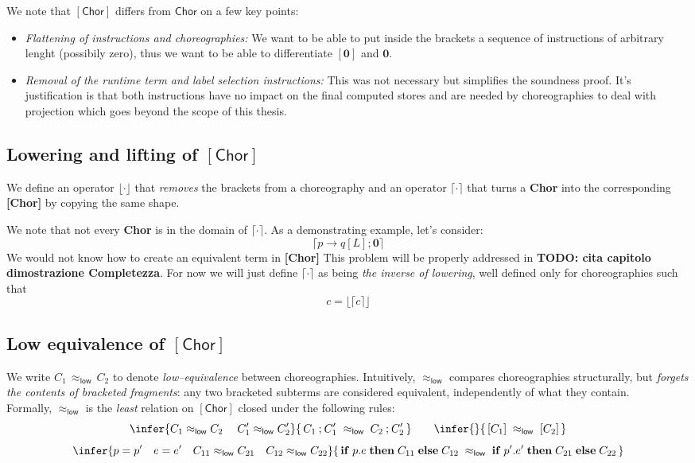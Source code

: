 \documentclass[12pt,a4paper,twoside]{book}
\begin{document}
We note that $\mathsf{[Chor]}$ differs from $\mathsf{Chor}$ on a few key points:
\begin{itemize}
	\item \emph{Flattening of instructions and choreographies:} We want to be able to put inside the brackets a sequence of instructions of arbitrary lenght (possibily zero), thus we want to be able to differentiate $[\boldsymbol{0}]$ and $\boldsymbol{0}$.
	\item \emph{Removal of the runtime term and label selection instructions:} This was not necessary but simplifies the soundness proof. It's justification is that both instructions have no impact on the final computed stores and are needed by choreographies to deal with projection\cite{montesi2023introduction} which goes beyond the scope of this thesis.
\end{itemize}

\subsection{Lowering and lifting of $\mathsf{[Chor]}$}
We define an operator $\lfloor \cdot \rfloor$ that \emph{removes} the brackets from a choreography and an operator $\lceil \cdot \rceil$ that turns a \textbf{Chor} into the corresponding \textbf{[Chor]} by copying the same shape.

We note that not every \textbf{Chor} is in the domain of $\lceil \cdot \rceil$.
As a demonstrating example, let's consider:
$$
\lceil p \rightarrow q[L]; \boldsymbol{0} \rceil
$$
We would not know how to create an equivalent term in \textbf{[Chor]}
This problem will be properly addressed in \textbf{TODO: cita capitolo dimostrazione Completezza}. For now we will just define $\lceil \cdot \rceil$ as being \emph{the inverse of lowering}, well defined only for choreographies such that
$$ c = \lfloor \lceil c \rceil \rfloor $$


\subsection{Low equivalence of $\mathsf{[Chor]}$}
We write \(C_1 \,\approx_{\mathsf{low}}\, C_2\) to denote \emph{low–equivalence} between choreographies.
Intuitively, \(\approx_{\mathsf{low}}\) compares choreographies structurally, but \emph{forgets the
contents of bracketed fragments}: any two bracketed subterms are considered equivalent,
independently of what they contain.\\
Formally, \(\approx_{\mathsf{low}}\) is the \emph{least} relation on \(\mathsf{[Chor]}\) closed under the following rules:
\[
\infer
  {C_1 \approx_{\mathsf{low}} C_2 \quad\; C_1' \approx_{\mathsf{low}} C_2'}
  {\,C_1 \mathbin{;} C_1' \;\approx_{\mathsf{low}}\; C_2 \mathbin{;} C_2'\,}
\qquad
\infer
  {}
  {\,[C_1] \;\approx_{\mathsf{low}}\; [C_2]\,}
\]
\[
\infer
 {p = p' \quad e = e' \quad C_{11} \approx_{\mathsf{low}} C_{21} \quad C_{12} \approx_{\mathsf{low}} C_{22}}
 {\,\mathbf{if}\; p.e\; \mathbf{then}\; C_{11}\; \mathbf{else}\; C_{12}
   \;\approx_{\mathsf{low}}\;
   \mathbf{if}\; p'.e'\; \mathbf{then}\; C_{21}\; \mathbf{else}\; C_{22}\,}
\]
\end{document}
